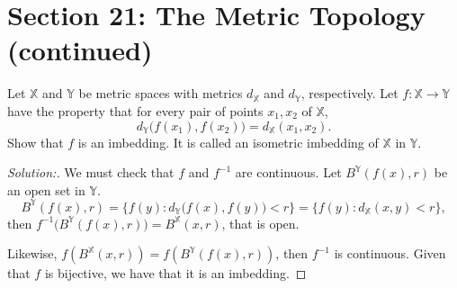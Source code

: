 \documentclass[a4paper,12pt, reqno]{article}
\theoremstyle{definition}
\newenvironment{exerr}[1]{
  \renewcommand\theexeralt{#1}
  \exeralt
}{\endexeralt}
\newenvironment{solution}{\begin{proof}[Solution:]}{\end{proof}}
\newcommand{\X}{\mathbb{X}}
\newcommand{\Y}{\mathbb{Y}}
\begin{document}
\section*{Section 21: The Metric Topology (continued)}

\begin{exerr}{2}
  Let $\X$ and $\Y$ be metric spaces with metrics $d_{\X}$ and $d_{\Y}$, respectively. Let $f:\X\to\Y$ have the property that for every pair of points $x_{1},x_{2}$ of $\X$,
  \begin{equation*}
    d_{\Y}\big( f(x_{1}),f(x_{2}) \big) = d_{\X}(x_{1},x_{2}).
  \end{equation*}
  Show that $f$ is an imbedding. It is called an isometric imbedding of $\X$ in $\Y$.
\end{exerr}
\begin{solution}
  We must check that $f$ and $f^{-1}$ are continuous. Let $B^\Y(f(x),r)$ be an open set in $\Y$.
  \begin{equation*}
    B^\Y(f(x),r) = \{ f(y) : d_{\Y}\big( f(x),f(y) \big)<r \} = \{ f(y) : d_{\X}(x,y)<r \},
  \end{equation*}
  then $f^{-1}\big( B^\Y(f(x),r) \big) = B^\X(x,r)$, that is open.

  Likewise, $f(B^\X(x,r)) = f(B^\Y(f(x),r ))$, then $f^{-1}$ is continuous.  Given that $f$ is bijective, we have that it is an imbedding.
\end{solution}
\end{document}
